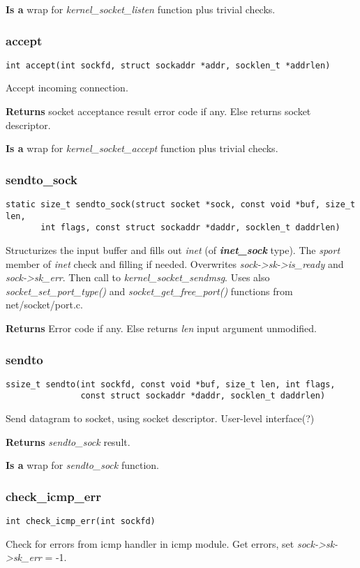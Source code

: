 \documentclass[12pt,a4paper]{article}
\begin{document}
{\bf Is a} wrap for {\it kernel\_socket\_listen} function  plus trivial checks.


\subsubsection{accept}
\label{sec:socket_c_accept}
\begin{verbatim}
int accept(int sockfd, struct sockaddr *addr, socklen_t *addrlen)
\end{verbatim}
Accept incoming connection.

{\bf Returns} socket acceptance result error code if any. Else returns socket
descriptor.

{\bf Is a} wrap for {\it kernel\_socket\_accept} function  plus trivial checks.


\subsubsection{sendto\_sock}
\label{sec:socket_c_sendto_sock}
\begin{verbatim}
static size_t sendto_sock(struct socket *sock, const void *buf, size_t len,
       int flags, const struct sockaddr *daddr, socklen_t daddrlen)
\end{verbatim}
Structurizes the input buffer and fills out {\it inet} (of {\bf \it inet\_sock}
type). The {\it sport} member of {\it inet} check and filling if needed.
Overwrites {\it sock->sk->is\_ready} and {\it sock->sk\_err}. Then call to
{\it kernel\_socket\_sendmsg}. Uses also {\it socket\_set\_port\_type()} and
{\it socket\_get\_free\_port()} functions from net/socket/port.c.

{\bf Returns} Error code if any. Else returns {\it len} input argument
unmodified.

\subsubsection{sendto}
\label{sec:socket_c_sendto}
\begin{verbatim}
ssize_t sendto(int sockfd, const void *buf, size_t len, int flags,
               const struct sockaddr *daddr, socklen_t daddrlen)
\end{verbatim}
Send datagram to socket, using socket descriptor. User-level interface(?)

{\bf Returns} {\it sendto\_sock} result.

{\bf Is a } wrap for {\it sendto\_sock} function.

\subsubsection{check\_icmp\_err}
\label{sec:socket_c_check_icmp_err}
\begin{verbatim}
int check_icmp_err(int sockfd)
\end{verbatim}
Check for errors from icmp handler in icmp module. Get errors, set
{\it sock->sk->sk\_err} = -1.
\end{document}
